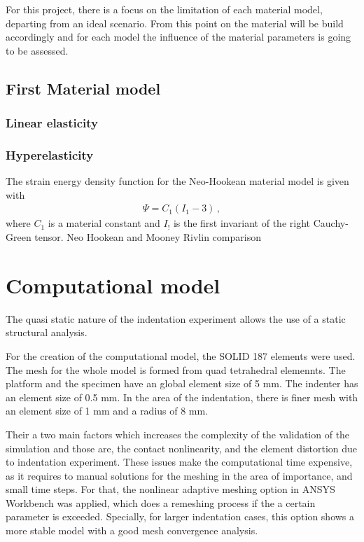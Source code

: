 For this project, there is a focus on the limitation of each material model, 
departing from an ideal scenario. From this point on the material will be build 
accordingly and for each model the influence of the material parameters is going
to be assessed.

\subsection{First Material model}

\subsubsection{Linear elasticity}


\subsubsection{Hyperelasticity}
The strain energy density function for the Neo-Hookean material model is given with
\begin{align*}
            \Psi = C_1 (I_1 - 3) \, ,
\end{align*}
where $C_1$ is a material constant and $I_!$ is the first invariant of the right Cauchy-Green tensor. 
Neo Hookean and Mooney Rivlin comparison


\section{Computational model}
The quasi static nature of the indentation experiment allows the use of a static 
structural analysis.

For the creation of the computational model, the SOLID 187 elements were used. The mesh 
for the whole model is formed from quad tetrahedral elemennts. The platform and 
the specimen have an global element size of 5 mm. The indenter has an element size of
0.5 mm. In the area of the indentation, there is finer mesh with an element size of
1 mm and a radius of 8 mm. 

Their a two main factors which increases the complexity of the validation of the simulation
and those are, the contact nonlinearity, and the element distortion due to indentation
 experiment. These issues make the computational time expensive, as it requires to manual 
 solutions for the meshing in the area of importance, and small time steps. 
 For that, 
 the nonlinear adaptive meshing option in ANSYS Workbench was applied, which does a remeshing
 process if the a certain parameter is exceeded.%
Specially, for larger indentation cases, this option shows a more stable model with a 
good mesh convergence analysis.

